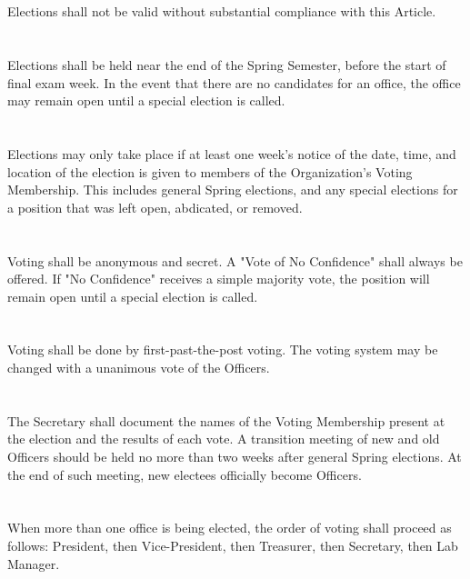 \documentclass[12pt]{cls/constitution}
\begin{document}

\section{}
Elections shall not be valid without substantial compliance with this Article. 

\section{}
Elections shall be held near the end of the Spring Semester, before the start of final exam week. In the event that there are no candidates for an office, the office may remain open until a special election is called. 

\section{}
Elections may only take place if at least one week’s notice of the date, time, and location of the election is given to members of the Organization's Voting Membership. This includes general Spring elections, and any special elections for a position that was left open, abdicated, or removed.

\section{}
Voting shall be anonymous and secret. A "Vote of No Confidence" shall always be offered. If "No Confidence" receives a simple majority vote, the position will remain open until a special election is called.

\section{}
Voting shall be done by first-past-the-post voting. The voting system may be changed with a unanimous vote of the Officers.

\section{}
The Secretary shall document the names of the Voting Membership present at the election and the results of each vote. A transition meeting of new and old Officers should be held no more than two weeks after general Spring elections. At the end of such meeting, new electees officially become Officers.

\section{}
When more than one office is being elected, the order of voting shall proceed as follows: President, then Vice-President, then Treasurer, then Secretary, then Lab Manager.
\end{document}
